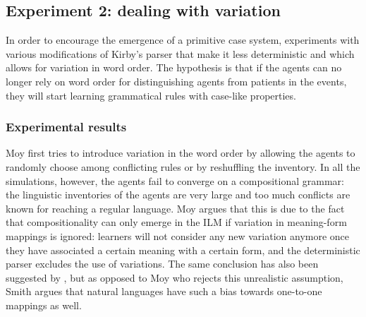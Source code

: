 \subsection{Experiment 2: dealing with variation}
\label{s:moy-communication}

In order to encourage the emergence of a primitive case system, \citet[chapter 5]{moy06case} experiments with various modifications of Kirby's parser that make it less deterministic and which allows for variation in word order. The hypothesis is that if the agents can no longer rely on word order for distinguishing agents from patients in the events, they will start learning grammatical rules with case-like properties.


\subsubsection{Experimental results}
Moy first tries to introduce variation in the word order by allowing the agents to randomly choose among conflicting rules or by reshuffling the inventory. In all the simulations, however, the agents fail to converge on a compositional grammar: the linguistic inventories of the agents are very large and too much conflicts are known for reaching a regular language. Moy argues that this is due to the fact that compositionality can only emerge in the ILM if variation in meaning-form mappings is ignored: learners will not consider any new variation anymore once they have associated a certain meaning with a certain form, and the deterministic parser excludes the use of variations. The same conclusion has also been suggested by \citet{smith03transmission}, but as opposed to Moy who rejects this unrealistic assumption, Smith argues that natural languages have such a bias towards one-to-one mappings as well.

